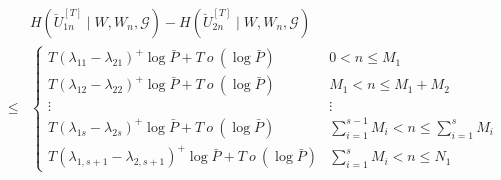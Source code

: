 \documentclass[11pt]{article}
\begin{document}
\begin{eqnarray}
&&H(\breve{U}_{1n}^{[T]}\mid W,W_n,\mathcal{G})-H(\breve{U}_{2n}^{[T]}\mid W,W_n,\mathcal{G})\nonumber\\
&\le&\left\{\begin{matrix}
T(\lambda_{11}-\lambda_{21})^+\log{\bar{P}} +T~o~(\log{\bar{P}})&0<n\le M_1 \\ 
T(\lambda_{12}-\lambda_{22})^+\log{\bar{P}} +T~o~(\log{\bar{P}}) &M_1<n\le M_1+M_2 \\ 
\vdots&\vdots\\
T(\lambda_{1s}-\lambda_{2s})^+\log{\bar{P}} +T~o~(\log{\bar{P}}) &\sum_{i=1}^{s-1}M_i<n\le \sum_{i=1}^{s}M_i\\
T(\lambda_{1,s+1}-\lambda_{2,s+1})^+\log{\bar{P}} +T~o~(\log{\bar{P}})&\sum_{i=1}^{s}M_i<n\le N_1 
\end{matrix}\right.\label{lemma3final}
\end{eqnarray}
\end{document}
